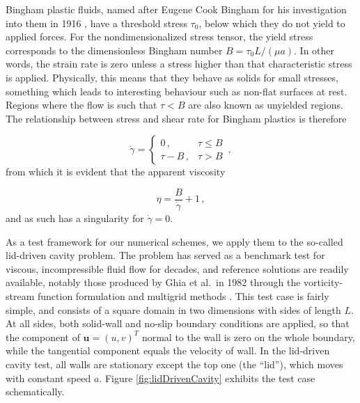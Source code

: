 \documentclass[final,3p,twocolumn]{elsarticle}
\begin{document}
Bingham plastic fluids, named after Eugene Cook Bingham for his investigation
into them in 1916 \cite{bingham1916investigation}, have a threshold stress
$\tau_0$, below which they do not yield to applied forces. For the
nondimensionalized stress tensor, the yield stress corresponds to the
dimensionless Bingham number $B = \tau_0 L/(\mu a)$. In other words, the strain
rate is zero unless a stress higher than that characteristic stress is applied.
Physically, this means that they behave as solids for small stresses, something
which leads to interesting behaviour such as non-flat surfaces at rest. Regions
where the flow is such that $\tau < B$ are also known as unyielded
regions. The relationship between stress and shear rate for Bingham plastics is
therefore

\begin{equation}
    \dot{\gamma} = \begin{cases}
        0 \,,& \tau \leq B \\ 
        \tau - B \,,& \tau > B \end{cases} \,,
    \label{eq:bingham}
\end{equation}
%
from which it is evident that the apparent viscosity 

\begin{equation}
    \eta = \frac{B}{\dot{\gamma}} + 1 \,,
    \label{eq:binghamViscosity}
\end{equation}
%
and as such has a singularity for $\dot{\gamma}=0$. 

As a test framework for our numerical schemes, we apply them to the so-called
lid-driven cavity problem. The problem has served as a benchmark test for
viscous, incompressible fluid flow for decades, and reference solutions are
readily available, notably those produced by Ghia et al.\ in 1982
through the vorticity-stream function formulation and multigrid methods
\cite{ghia1982high}. This test case is fairly simple, and consists of a square
domain in two dimensions with sides of length $L$. At all sides, both solid-wall and
no-slip boundary conditions are applied, so that the component of $\bm{u} =
(u,v)^T$ normal to the wall is zero on the whole boundary, while the tangential
component equals the velocity of wall. In the lid-driven cavity test, all walls
are stationary except the top one (the ``lid''), which moves with constant
speed $a$. Figure \ref{fig:lidDrivenCavity} exhibits the test case
schematically. 
\end{document}
